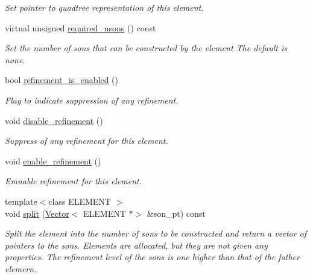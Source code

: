 \begin{DoxyCompactItemize}
\begin{DoxyCompactList}\small\item\em Set pointer to quadtree representation of this element. \end{DoxyCompactList}\item 
virtual unsigned \hyperlink{classoomph_1_1RefineableElement_a9761852271f6cc9a1a0552ad7e054e4b}{required\+\_\+nsons} () const
\begin{DoxyCompactList}\small\item\em Set the number of sons that can be constructed by the element The default is none. \end{DoxyCompactList}\item 
bool \hyperlink{classoomph_1_1RefineableElement_a8f5e9e69342ed6258c6f450fec4d0999}{refinement\+\_\+is\+\_\+enabled} ()
\begin{DoxyCompactList}\small\item\em Flag to indicate suppression of any refinement. \end{DoxyCompactList}\item 
void \hyperlink{classoomph_1_1RefineableElement_a8625a89189db0116f323a85d3207420b}{disable\+\_\+refinement} ()
\begin{DoxyCompactList}\small\item\em Suppress of any refinement for this element. \end{DoxyCompactList}\item 
void \hyperlink{classoomph_1_1RefineableElement_ab633c494a3815e0dc68139f7175eb3c7}{enable\+\_\+refinement} ()
\begin{DoxyCompactList}\small\item\em Emnable refinement for this element. \end{DoxyCompactList}\item 
{\footnotesize template$<$class E\+L\+E\+M\+E\+NT $>$ }\\void \hyperlink{classoomph_1_1RefineableElement_ad63bc42c2105ffbd5885ada20b4e88eb}{split} (\hyperlink{classoomph_1_1Vector}{Vector}$<$ E\+L\+E\+M\+E\+NT $\ast$$>$ \&son\+\_\+pt) const
\begin{DoxyCompactList}\small\item\em Split the element into the number of sons to be constructed and return a vector of pointers to the sons. Elements are allocated, but they are not given any properties. The refinement level of the sons is one higher than that of the father elemern. \end{DoxyCompactList}\item 
$$
\end{DoxyCompactItemize}
